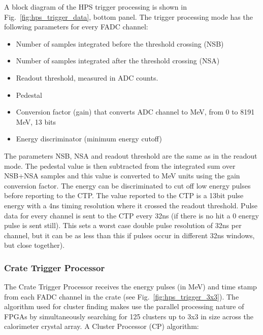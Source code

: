 A block diagram of the HPS  trigger processing is shown in Fig.~\ref{fig:hps_trigger_data}, bottom panel. 
The trigger processing mode has the following parameters for every FADC channel:
 \begin{itemize}
 \item Number of samples integrated before the threshold crossing (NSB)
 \item Number of samples integrated after the  threshold crossing (NSA)
 \item Readout threshold, measured in ADC counts.
 \item Pedestal
 \item Conversion factor (gain) that converts  ADC channel to MeV, from 0 to 8191 MeV, 13 bits
 \item Energy discriminator (minimum energy cutoff)
 \end{itemize}
The parameters NSB, NSA and readout threshold are the same as in the readout mode.
The pedestal value is then subtracted from the integrated sum over NSB+NSA samples and this value is converted to MeV units using the gain conversion factor. The energy can be discriminated to cut off low energy pulses before reporting to the CTP. The value reported to the CTP is a 13bit pulse energy with a 4ns timing resolution where it crossed the readout threshold. Pulse data for every channel is sent to the CTP every 32ns (if there is no hit a 0 energy pulse is sent still). This sets a worst case double pulse resolution of 32ns per channel, but it can be as less than this if pulses occur in different 32ns windows, but close together).




\subsubsection{Crate Trigger Processor} 

The Crate Trigger Processor receives the energy pulses (in MeV) and time stamp from each FADC channel in the crate (see Fig.~\ref{fig:hps_trigger_3x3}).
The algorithm used for cluster finding makes use the parallel processing nature of FPGAs by simultaneously searching for 125 clusters up to 3x3 in size across the calorimeter crystal array.  
A Cluster Processor (CP) algorithm:

